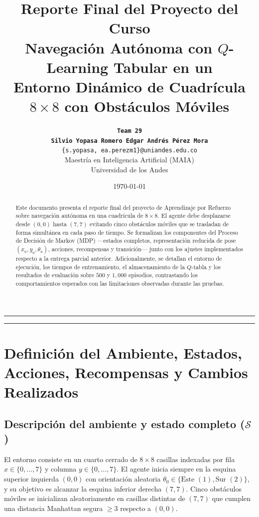 \documentclass[11pt,a4paper]{article}
\title{\vspace{-1.4cm}\textbf{\LARGE \textcolor{primary}{Reporte Final del Proyecto del Curso}}\\[0.25cm]
\Large \textcolor{secondary}{Navegación Autónoma con \(Q\)-Learning Tabular en un\\Entorno Dinámico de Cuadrícula \(8 \times 8\) con Obstáculos Móviles}}
\author{\textbf{\tt\small Team 29}\\
{\tt\small \textbf{Silvio Yopasa Romero} \qquad \textbf{Edgar Andrés Pérez Mora}}\\
{\tt\small \{s.yopasa, ea.perezm1\}@uniandes.edu.co}\\
\small Maestría en Inteligencia Artificial (MAIA)\\
\small Universidad de los Andes}
\date{\today}
\begin{document}
\maketitle
\thispagestyle{fancy}
\hrule \vspace{0.3cm}

\begin{abstract}
Este documento presenta el reporte final del proyecto de Aprendizaje por Refuerzo sobre navegación autónoma en una cuadrícula de \(8 \times 8\). El agente debe desplazarse desde \((0,0)\) hasta \((7,7)\) evitando cinco obstáculos móviles que se trasladan de forma simultánea en cada paso de tiempo. Se formalizan los componentes del Proceso de Decisión de Markov (MDP) —estados completos, representación reducida de pose \((x_a, y_a, \theta_a)\), acciones, recompensas y transición— junto con los ajustes implementados respecto a la entrega parcial anterior. Adicionalmente, se detallan el entorno de ejecución, los tiempos de entrenamiento, el almacenamiento de la \(Q\)-tabla y los resultados de evaluación sobre \(500\) y \(1{,}000\) episodios, contrastando los comportamientos esperados con las limitaciones observadas durante las pruebas.
\end{abstract}

\vspace{0.25cm} \hrule \vspace{0.35cm}

\section{Definición del Ambiente, Estados, Acciones, Recompensas y Cambios Realizados}

\subsection{Descripción del ambiente y estado completo (\(\mathcal{S}\))}
El entorno consiste en un cuarto cerrado de \(8 \times 8\) casillas indexadas por fila \(x \in \{0,\dots,7\}\) y columna \(y \in \{0,\dots,7\}\). El agente inicia siempre en la esquina superior izquierda \((0,0)\) con orientación aleatoria \(\theta_0 \in \{\text{Este } (1), \text{Sur } (2)\}\), y su objetivo es alcanzar la esquina inferior derecha \((7,7)\). Cinco obstáculos móviles se inicializan aleatoriamente en casillas distintas de \((7,7)\) que cumplen una distancia Manhattan segura \(\ge 3\) respecto a \((0,0)\).
\end{document}

